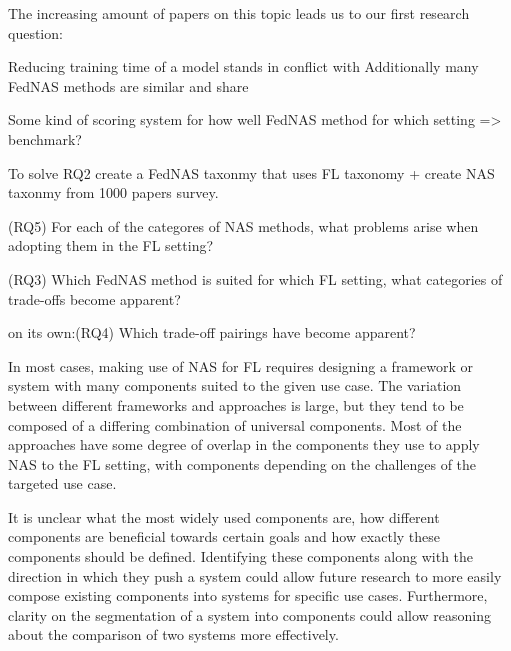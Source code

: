 The increasing amount of papers on this topic leads us to our first research question: 


Reducing training time of a model stands in conflict with  
Additionally many FedNAS methods are similar and share 

Some kind of scoring system for how well FedNAS method for which setting => benchmark?


To solve RQ2 create a FedNAS taxonmy that uses FL taxonomy + create NAS taxonmy from 1000 papers survey.

(RQ5) For each of the categores of NAS methods, what problems arise when adopting them in the FL setting?

(RQ3) Which FedNAS method is suited for which FL setting, what categories of trade-offs become apparent?

on its own:(RQ4) Which trade-off pairings have become apparent?

In most cases, making use of NAS for FL requires designing a framework or system with many components suited to the given use case. The variation between different frameworks and approaches is large, but they tend to be composed of a differing combination of universal components. Most of the approaches have some degree of overlap in the components they use to apply NAS to the FL setting, with components depending on the challenges of the targeted use case. 

It is unclear what the most widely used components are, how different components are beneficial towards certain goals and how exactly these components should be defined. Identifying these components along with the direction in which they push a system could allow future research to more easily compose existing components into systems for specific use cases. Furthermore, clarity on the segmentation of a system into components could allow reasoning about the comparison of two systems more effectively.



